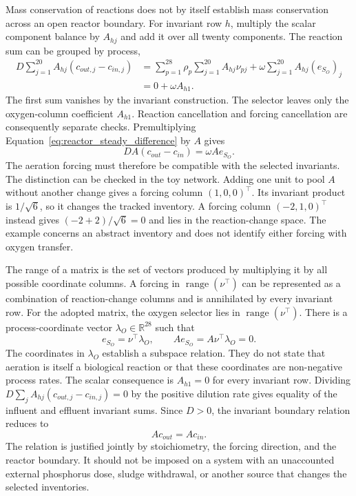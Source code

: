 Mass conservation of reactions does not by itself establish mass conservation across an open reactor boundary. For invariant row $h$, multiply the scalar component balance by $A_{hj}$ and add it over all twenty components. The reaction sum can be grouped by process,
\[
\begin{aligned}
D\sum_{j=1}^{20}A_{hj}(c_{out,j}-c_{in,j})
&=\sum_{p=1}^{28}\rho_p\sum_{j=1}^{20}A_{hj}\nu_{pj}
+\omega\sum_{j=1}^{20}A_{hj}(e_{S_O})_j\\
&=0+\omega A_{h1}.
\end{aligned}
\]
The first sum vanishes by the invariant construction. The selector leaves only the oxygen-column coefficient $A_{h1}$. Reaction cancellation and forcing cancellation are consequently separate checks. Premultiplying Equation~\eqref{eq:reactor_steady_difference} by $A$ gives
\begin{equation}
D A(c_{out}-c_{in})=\omega A e_{S_O}.
\label{eq:invariant_boundary_balance}
\end{equation}
The aeration forcing must therefore be compatible with the selected invariants. The distinction can be checked in the toy network. Adding one unit to pool $A$ without another change gives a forcing column $(1,0,0)^\top$. Its invariant product is $1/\sqrt6$, so it changes the tracked inventory. A forcing column $(-2,1,0)^\top$ instead gives $(-2+2)/\sqrt6=0$ and lies in the reaction-change space. The example concerns an abstract inventory and does not identify either forcing with oxygen transfer.

The range of a matrix is the set of vectors produced by multiplying it by all possible coordinate columns. A forcing in $\operatorname{range}(\nu^\top)$ can be represented as a combination of reaction-change columns and is annihilated by every invariant row. For the adopted matrix, the oxygen selector lies in $\operatorname{range}(\nu^\top)$. There is a process-coordinate vector $\lambda_O\in\mathbb{R}^{28}$ such that
\begin{equation}
e_{S_O}=\nu^\top\lambda_O,\qquad
Ae_{S_O}=A\nu^\top\lambda_O=0.
\label{eq:oxygen_forcing_compatibility}
\end{equation}
The coordinates in $\lambda_O$ establish a subspace relation. They do not state that aeration is itself a biological reaction or that these coordinates are non-negative process rates. The scalar consequence is $A_{h1}=0$ for every invariant row. Dividing $D\sum_j A_{hj}(c_{out,j}-c_{in,j})=0$ by the positive dilution rate gives equality of the influent and effluent invariant sums. Since $D>0$, the invariant boundary relation reduces to
\begin{equation}
Ac_{out}=Ac_{in}.
\label{eq:reactor_invariant_equality}
\end{equation}
The relation is justified jointly by stoichiometry, the forcing direction, and the reactor boundary. It should not be imposed on a system with an unaccounted external phosphorus dose, sludge withdrawal, or another source that changes the selected inventories.

